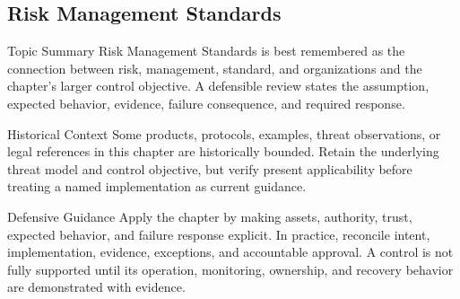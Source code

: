\documentclass[11pt,letterpaper]{article}
\begin{document}
\subsection*{Risk Management Standards}
\begin{CornellNotesTable}
\end{CornellNotesTable}
\begin{CornellSummaryBox}{Topic Summary}
Risk Management Standards is best remembered as the connection between risk, management, standard, and organizations and the chapter's larger control objective. A defensible review states the assumption, expected behavior, evidence, failure consequence, and required response.
\end{CornellSummaryBox}
\begin{CornellWarningBox}{Historical Context}
Some products, protocols, examples, threat observations, or legal references in this chapter are historically bounded. Retain the underlying threat model and control objective, but verify present applicability before treating a named implementation as current guidance.
\end{CornellWarningBox}
\begin{CornellOverviewBox}{Defensive Guidance}
Apply the chapter by making assets, authority, trust, expected behavior, and failure response explicit. In practice, reconcile intent, implementation, evidence, exceptions, and accountable approval. A control is not fully supported until its operation, monitoring, ownership, and recovery behavior are demonstrated with evidence.
\end{CornellOverviewBox}
\end{document}
